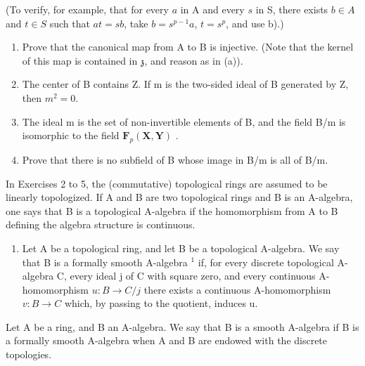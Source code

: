 (To verify, for example, that for every \(a\) in A and every \(s\) in S, there exists \(b \in A\) and \(t \in S\) such that \(at = sb\), take \(b = s^{p-1}a\), \(t = s^p\), and use b).)

\begin{enumerate}
\def\labelenumi{\alph{enumi})}
\setcounter{enumi}{3}
\item
  Prove that the canonical map from A to B is injective. (Note that the kernel of this map is contained in \(\mathfrak{z}\), and reason as in (a)).
\item
  The center of B contains Z. If m is the two-sided ideal of B generated by Z, then \(m^{2} = 0\).
\item
  The ideal m is the set of non-invertible elements of B, and the field B/m is isomorphic to the field \(\mathbf{F}_{p}(\mathbf{X}, \mathbf{Y})\) .
\item
  Prove that there is no subfield of B whose image in B/m is all of B/m.
\end{enumerate}

In Exercises 2 to 5, the (commutative) topological rings are assumed to be linearly topologized. If A and B are two topological rings and B is an A-algebra, one says that B is a topological A-algebra if the homomorphism from A to B defining the algebra structure is continuous.

\begin{enumerate}
\def\labelenumi{\arabic{enumi})}
\setcounter{enumi}{1}
\tightlist
\item
  Let A be a topological ring, and let B be a topological A-algebra. We say that B is a formally smooth A-algebra \(^{1}\) if, for every discrete topological A-algebra C, every ideal j of C with square zero, and every continuous A-homomorphism \(u: B \to C/j\) there exists a continuous A-homomorphism \(v: B \to C\) which, by passing to the quotient, induces u.
\end{enumerate}

Let A be a ring, and B an A-algebra. We say that B is a smooth A-algebra if B is a formally smooth A-algebra when A and B are endowed with the discrete topologies.

